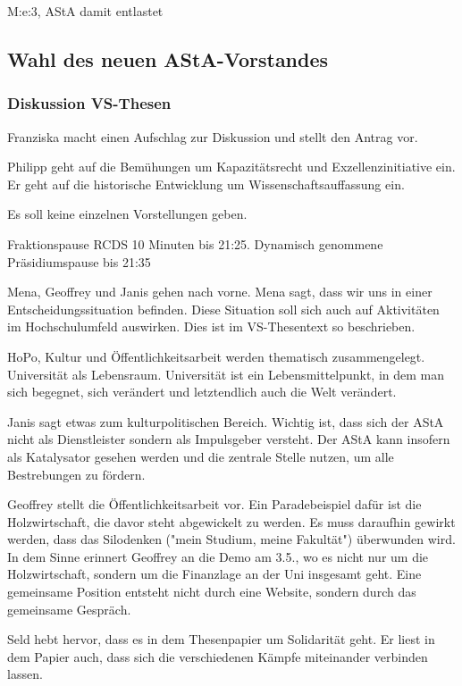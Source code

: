 \documentclass[ngerman,headheight=70pt]{scrartcl}
\begin{document}
    M:e:3, AStA damit entlastet

    \subsection{Wahl des neuen AStA-Vorstandes}

    \subsubsection{Diskussion VS-Thesen}

    Franziska macht einen Aufschlag zur Diskussion und stellt
    den Antrag vor.

    Philipp geht auf die Bemühungen um Kapazitätsrecht und Exzellenzinitiative ein.
    Er geht auf die historische Entwicklung um Wissenschaftsauffassung ein.

    Es soll keine einzelnen Vorstellungen geben.

    Fraktionspause RCDS 10 Minuten bis 21:25.
    Dynamisch genommene Präsidiumspause bis 21:35

    Mena, Geoffrey und Janis gehen nach vorne. Mena sagt, dass wir uns in einer
    Entscheidungssituation befinden. Diese Situation soll sich auch auf Aktivitäten
    im Hochschulumfeld auswirken. Dies ist im VS-Thesentext so beschrieben.

    HoPo, Kultur und Öffentlichkeitsarbeit werden thematisch zusammengelegt.
    Universität als Lebensraum. Universität ist ein Lebensmittelpunkt, in dem
    man sich begegnet, sich verändert und letztendlich auch die Welt verändert.

    Janis sagt etwas zum kulturpolitischen Bereich. Wichtig ist, dass sich
    der AStA nicht als Dienstleister sondern als Impulsgeber versteht.
    Der AStA kann insofern als Katalysator gesehen werden und die zentrale
    Stelle nutzen, um alle Bestrebungen zu fördern.

    Geoffrey stellt die Öffentlichkeitsarbeit vor. Ein Paradebeispiel dafür
    ist die Holzwirtschaft, die davor steht abgewickelt zu werden. Es muss
    daraufhin gewirkt werden, dass das Silodenken ("mein Studium, meine Fakultät")
    überwunden wird. In dem Sinne erinnert Geoffrey an die Demo am 3.5., wo es
    nicht nur um die Holzwirtschaft, sondern um die Finanzlage an der Uni insgesamt
    geht. Eine gemeinsame Position entsteht nicht durch eine Website, sondern
    durch das gemeinsame Gespräch.

    Seld hebt hervor, dass es in dem Thesenpapier um Solidarität geht.
    Er liest in dem Papier auch, dass sich die verschiedenen Kämpfe miteinander
    verbinden lassen.
\end{document}
